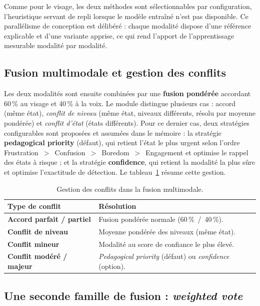 Comme pour le visage, les deux méthodes sont sélectionnables par configuration,
l'heuristique servant de repli lorsque le modèle entraîné n'est pas disponible.
Ce parallélisme de conception est délibéré : chaque modalité dispose d'une
référence explicable et d'une variante apprise, ce qui rend l'apport de
l'apprentissage mesurable modalité par modalité.

\subsection{Fusion multimodale et gestion des conflits}

Les deux modalités sont ensuite combinées par une \textbf{fusion pondérée}
accordant 60\,\% au visage et 40\,\% à la voix. Le module distingue plusieurs cas :
accord (même état), \emph{conflit de niveau} (même état, niveaux différents,
résolu par moyenne pondérée) et \emph{conflit d'état} (états différents). Pour ce
dernier cas, deux stratégies configurables sont proposées et assumées dans le
mémoire : la stratégie \textbf{pedagogical priority} (défaut), qui retient l'état le plus
urgent selon l'ordre Frustration~$>$~Confusion~$>$~Boredom~$>$~Engagement et
optimise le rappel des états à risque ; et la stratégie \textbf{confidence},
qui retient la modalité la plus sûre et optimise l'exactitude de détection. Le
tableau~\ref{tab:conflits} résume cette gestion.

\begin{table}[H]
\centering
\renewcommand{\arraystretch}{1.2}
\begin{tabular}{>{\bfseries}l p{8.8cm}}
\toprule
Type de conflit & Résolution \\
\midrule
Accord parfait / partiel & Fusion pondérée normale (60\,\%~/~40\,\%). \\
Conflit de niveau        & Moyenne pondérée des niveaux (même état). \\
Conflit mineur           & Modalité au score de confiance le plus élevé. \\
Conflit modéré / majeur  & \emph{Pedagogical priority} (défaut) ou \emph{confidence} (option). \\
\bottomrule
\end{tabular}
\caption{Gestion des conflits dans la fusion multimodale.}
\label{tab:conflits}
\end{table}

\subsection{Une seconde famille de fusion : \emph{weighted vote}}
\label{subsec:vote}

